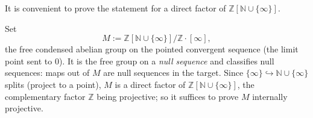 It is convenient to prove the statement for a direct factor of
$\mathbb{Z}[\mathbb{N}\cup\{\infty\}]$.

\begin{definition}
\label{def:3:null-sequence-group}
Set
\begin{equation*}
M:=\mathbb{Z}[\mathbb{N}\cup\{\infty\}]\big/\mathbb{Z}\cdot[\infty],
\end{equation*}
the free condensed abelian group on the pointed convergent sequence (the limit
point sent to $0$). It is the free group on a \emph{null sequence} and classifies
null sequences: maps out of $M$ are null sequences in the target. Since
$\{\infty\}\hookrightarrow\mathbb{N}\cup\{\infty\}$ splits (project to a point),
$M$ is a direct factor of $\mathbb{Z}[\mathbb{N}\cup\{\infty\}]$, the complementary
factor $\mathbb{Z}$ being projective; so it suffices to prove $M$ internally
projective.
\end{definition}

